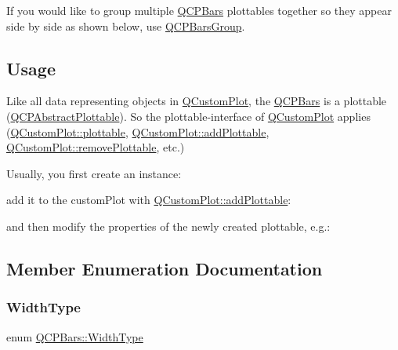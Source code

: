 If you would like to group multiple \hyperlink{class_q_c_p_bars}{Q\+C\+P\+Bars} plottables together so they appear side by side as shown below, use \hyperlink{class_q_c_p_bars_group}{Q\+C\+P\+Bars\+Group}.

\hypertarget{class_q_c_p_statistical_box_usage}{}\subsection{Usage}\label{class_q_c_p_statistical_box_usage}
Like all data representing objects in \hyperlink{class_q_custom_plot}{Q\+Custom\+Plot}, the \hyperlink{class_q_c_p_bars}{Q\+C\+P\+Bars} is a plottable (\hyperlink{class_q_c_p_abstract_plottable}{Q\+C\+P\+Abstract\+Plottable}). So the plottable-\/interface of \hyperlink{class_q_custom_plot}{Q\+Custom\+Plot} applies (\hyperlink{class_q_custom_plot_a32de81ff53e263e785b83b52ecd99d6f}{Q\+Custom\+Plot\+::plottable}, \hyperlink{class_q_custom_plot_ab7ad9174f701f9c6f64e378df77927a6}{Q\+Custom\+Plot\+::add\+Plottable}, \hyperlink{class_q_custom_plot_af3dafd56884208474f311d6226513ab2}{Q\+Custom\+Plot\+::remove\+Plottable}, etc.)

Usually, you first create an instance\+: 
\begin{DoxyCodeInclude}
\end{DoxyCodeInclude}
add it to the custom\+Plot with \hyperlink{class_q_custom_plot_ab7ad9174f701f9c6f64e378df77927a6}{Q\+Custom\+Plot\+::add\+Plottable}\+: 
\begin{DoxyCodeInclude}
\end{DoxyCodeInclude}
and then modify the properties of the newly created plottable, e.\+g.\+: 
\begin{DoxyCodeInclude}
\end{DoxyCodeInclude}


\subsection{Member Enumeration Documentation}
\hypertarget{class_q_c_p_bars_a65dbbf1ab41cbe993d71521096ed4649}{}\label{class_q_c_p_bars_a65dbbf1ab41cbe993d71521096ed4649} 
\subsubsection{\texorpdfstring{Width\+Type}{WidthType}}
{\footnotesize\ttfamily enum \hyperlink{class_q_c_p_bars_a65dbbf1ab41cbe993d71521096ed4649}{Q\+C\+P\+Bars\+::\+Width\+Type}}

